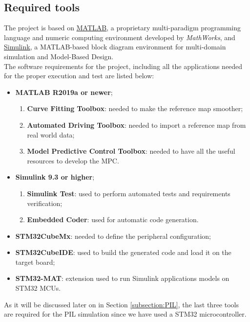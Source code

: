 \subsection{Required tools}
The project is based on \href{https://www.mathworks.com/help/matlab/index.html?s_tid=srchtitle}{\underline{MATLAB}}, a proprietary multi-paradigm programming language and numeric computing environment developed by \textit{MathWorks}, and \href{https://www.mathworks.com/help/simulink/index.html?s_tid=CRUX_lftnav}{\underline{Simulink}}, a MATLAB-based block diagram environment for multi-domain simulation and Model-Based Design.\\
The software requirements for the project, including all the applications needed for the proper execution and test are listed below:
\begin{itemize}
    \item \textbf{MATLAB R2019a or newer};
    \begin{enumerate}
            \item \textbf{Curve Fitting Toolbox}: needed to make the reference map smoother;
            \item \textbf{Automated Driving Toolbox}: needed to import a reference map from real world data;
            \item \textbf{Model Predictive Control Toolbox}: needed to have all the useful resources to develop the MPC.
    \end{enumerate}
    \item \textbf{Simulink 9.3 or higher};
    \begin{enumerate}
            \item \textbf{Simulink Test}: used to perform automated tests and requirements verification;
            \item \textbf{Embedded Coder}: used for automatic code generation.
    \end{enumerate}
    
    \item \textbf{STM32CubeMx}: needed to define the peripheral configuration;
    \item \textbf{STM32CubeIDE}: used to build the generated code and load it on the target board;
    \item \textbf{STM32-MAT}: extension used to run Simulink applications models on STM32 MCUs.
\end{itemize}

As it will be discussed later on in Section \ref{subsection:PIL}, the last three tools are required for the PIL simulation since we have used a STM32 microcontroller.




